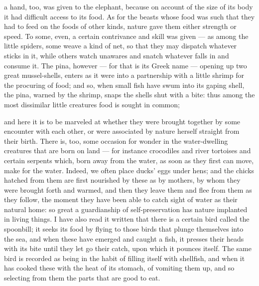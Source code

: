  a hand, too, was given to the elephant, because on account of the size of its body it had difficult access to its food. As for the beasts whose food was such that they had to feed on the foods of other kinds, nature gave them either strength or speed. To some, even, a certain contrivance and skill was given — as among the little spiders, some weave a kind of net, so that they may dispatch whatever sticks in it, while others watch unawares and snatch whatever falls in and consume it. The pina, however — for that is its Greek name — opening up two great mussel-shells, enters as it were into a partnership with a little shrimp for the procuring of food; and so, when small fish have swum into its gaping shell, the pina, warned by the shrimp, snaps the shells shut with a bite: thus among the most dissimilar little creatures food is sought in common;

 and here it is to be marveled at whether they were brought together by some encounter with each other, or were associated by nature herself straight from their birth. There is, too, some occasion for wonder in the water-dwelling creatures that are born on land — for instance crocodiles and river tortoises and certain serpents which, born away from the water, as soon as they first can move, make for the water. Indeed, we often place ducks' eggs under hens; and the chicks hatched from them are first nourished by these as by mothers, by whom they were brought forth and warmed, and then they leave them and flee from them as they follow, the moment they have been able to catch sight of water as their natural home: so great a guardianship of self-preservation has nature implanted in living things. I have also read it written that there is a certain bird called the spoonbill; it seeks its food by flying to those birds that plunge themselves into the sea, and when these have emerged and caught a fish, it presses their heads with its bite until they let go their catch, upon which it pounces itself. The same bird is recorded as being in the habit of filling itself with shellfish, and when it has cooked these with the heat of its stomach, of vomiting them up, and so selecting from them the parts that are good to eat.

